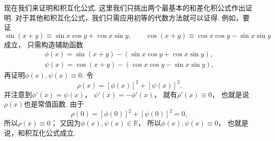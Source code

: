 现在我们来证明和积互化公式.
这里我们只挑出两个最基本的和差化积公式作出证明.
对于其他和积互化公式，我们只需应用初等的代数方法就可以证得.
例如，要证\begin{equation*}
	\sin(x+y) \equiv \sin x \cos y + \cos x \sin y,
	\qquad
	\cos(x+y) \equiv \cos x \cos y - \sin x \sin y
\end{equation*}成立，
只需构造辅助函数\begin{gather*}
	\phi(x)
	= \sin(x+y) - (\sin x \cos y + \cos x \sin y), \\
	\psi(x)
	= \cos(x+y) - (\cos x \cos y - \sin x \sin y),
\end{gather*}
再证明\(\phi(x),\psi(x) \equiv 0\).
令\begin{equation*}
	\rho(x)
	= [\phi(x)]^2 + [\psi(x)]^2.
\end{equation*}
并注意到\(\phi'(x) = \psi(x)\)，
\(\psi'(x) = -\phi'(x)\)，
就有\(\rho'(x) \equiv 0\)，
也就是说\(\rho(x)\)也是常值函数.
由于\begin{equation*}
\rho(0) = [\phi(0)]^2 + [\psi(0)]^2 = 0,
\end{equation*}
所以\(\rho(x) \equiv 0\)；
又因为\(\phi(x),\psi(x) \in \mathbb{R}\)，
所以\(\phi(x),\psi(x) \equiv 0\)，
也就是说，和积互化公式成立.
